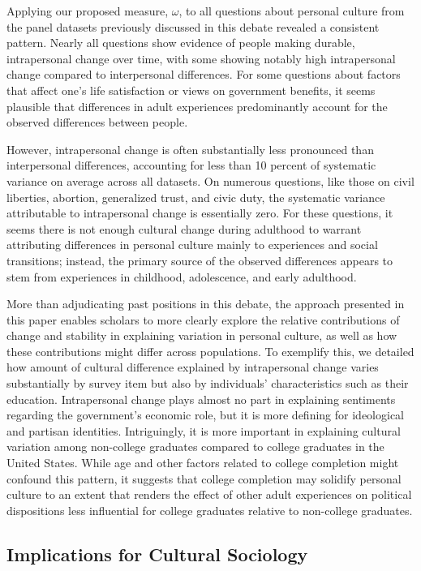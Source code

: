\documentclass[
  12pt,
]{article}
\begin{document}
Applying our proposed measure, \(\omega\), to all questions about
personal culture from the panel datasets previously discussed in this
debate revealed a consistent pattern. Nearly all questions show evidence
of people making durable, intrapersonal change over time, with some
showing notably high intrapersonal change compared to interpersonal
differences. For some questions about factors that affect one's life
satisfaction or views on government benefits, it seems plausible that
differences in adult experiences predominantly account for the observed
differences between people.

However, intrapersonal change is often substantially less pronounced
than interpersonal differences, accounting for less than 10 percent of
systematic variance on average across all datasets. On numerous
questions, like those on civil liberties, abortion, generalized trust,
and civic duty, the systematic variance attributable to intrapersonal
change is essentially zero. For these questions, it seems there is not
enough cultural change during adulthood to warrant attributing
differences in personal culture mainly to experiences and social
transitions; instead, the primary source of the observed differences
appears to stem from experiences in childhood, adolescence, and early
adulthood.

More than adjudicating past positions in this debate, the approach
presented in this paper enables scholars to more clearly explore the
relative contributions of change and stability in explaining variation
in personal culture, as well as how these contributions might differ
across populations. To exemplify this, we detailed how amount of
cultural difference explained by intrapersonal change varies
substantially by survey item but also by individuals' characteristics
such as their education. Intrapersonal change plays almost no part in
explaining sentiments regarding the government's economic role, but it
is more defining for ideological and partisan identities. Intriguingly,
it is more important in explaining cultural variation among non-college
graduates compared to college graduates in the United States. While age
and other factors related to college completion might confound this
pattern, it suggests that college completion may solidify personal
culture to an extent that renders the effect of other adult experiences
on political dispositions less influential for college graduates
relative to non-college graduates.

\hypertarget{implications-for-cultural-sociology}{%
\subsection{Implications for Cultural
Sociology}\label{implications-for-cultural-sociology}}
\end{document}
